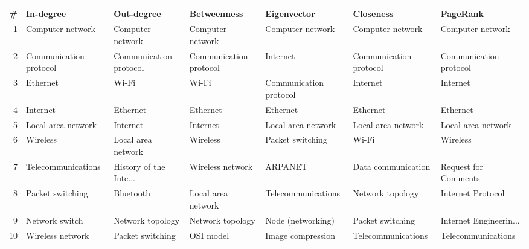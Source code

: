 
\begin{tabular}{rllllll}
\toprule
\# & In-degree & Out-degree & Betweenness & Eigenvector & Closeness & PageRank\\
\midrule
1 & Computer network & Computer network & Computer network & Computer network & Computer network & Computer network\\
2 & Communication protocol & Communication protocol & Communication protocol & Internet & Communication protocol & Communication protocol\\
3 & Ethernet & Wi-Fi & Wi-Fi & Communication protocol & Internet & Internet\\
4 & Internet & Ethernet & Ethernet & Ethernet & Ethernet & Ethernet\\
5 & Local area network & Internet & Internet & Local area network & Local area network & Local area network\\
6 & Wireless & Local area network & Wireless & Packet switching & Wi-Fi & Wireless\\
7 & Telecommunications & History of the Inte... & Wireless network & ARPANET & Data communication & Request for Comments\\
8 & Packet switching & Bluetooth & Local area network & Telecommunications & Network topology & Internet Protocol\\
9 & Network switch & Network topology & Network topology & Node (networking) & Packet switching & Internet Engineerin...\\
10 & Wireless network & Packet switching & OSI model & Image compression & Telecommunications & Telecommunications\\
\bottomrule
\end{tabular}
